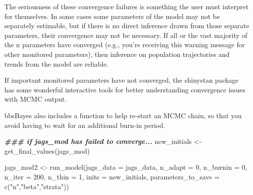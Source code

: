 \documentclass[
]{book}
\newenvironment{Shaded}{\begin{snugshade}}{\end{snugshade}}
\newcommand{\AttributeTok}[1]{\textcolor[rgb]{0.77,0.63,0.00}{#1}}
\newcommand{\CommentTok}[1]{\textcolor[rgb]{0.56,0.35,0.01}{\textit{#1}}}
\newcommand{\DecValTok}[1]{\textcolor[rgb]{0.00,0.00,0.81}{#1}}
\newcommand{\DocumentationTok}[1]{\textcolor[rgb]{0.56,0.35,0.01}{\textbf{\textit{#1}}}}
\newcommand{\FunctionTok}[1]{\textcolor[rgb]{0.00,0.00,0.00}{#1}}
\newcommand{\NormalTok}[1]{#1}
\newcommand{\OtherTok}[1]{\textcolor[rgb]{0.56,0.35,0.01}{#1}}
\newcommand{\SpecialCharTok}[1]{\textcolor[rgb]{0.00,0.00,0.00}{#1}}
\newcommand{\StringTok}[1]{\textcolor[rgb]{0.31,0.60,0.02}{#1}}
\begin{document}
The seriousness of these convergence failures is something the user must interpret for themselves. In some cases some parameters of the model may not be separately estimable, but if there is no direct inference drawn from those separate parameters, their convergence may not be necessary. If all or the vast majority of the n parameters have converged (e.g., you're receiving this warning message for other monitored parameters), then inference on population trajectories and trends from the model are reliable.

If important monitored parameters have not converged, the shinystan package has some wonderful interactive tools for better understanding convergence issues with MCMC output.

\begin{Shaded}
\end{Shaded}

bbsBayes also includes a function to help re-start an MCMC chain, so that you avoid having to wait for an additional burn-in period.

\begin{Shaded}
\begin{Highlighting}[]
\DocumentationTok{\#\#\# if jags\_mod has failed to converge...}
\NormalTok{new\_initials }\OtherTok{\textless{}{-}} \FunctionTok{get\_final\_values}\NormalTok{(jags\_mod)}

\NormalTok{jags\_mod2 }\OtherTok{\textless{}{-}} \FunctionTok{run\_model}\NormalTok{(}\AttributeTok{jags\_data =}\NormalTok{ jags\_data,}
                      \AttributeTok{n\_adapt =} \DecValTok{0}\NormalTok{,}
                      \AttributeTok{n\_burnin =} \DecValTok{0}\NormalTok{,}
                      \AttributeTok{n\_iter =} \DecValTok{200}\NormalTok{,}
                      \AttributeTok{n\_thin =} \DecValTok{1}\NormalTok{,}
                      \AttributeTok{inits =}\NormalTok{ new\_initials,}
                      \AttributeTok{parameters\_to\_save =} \FunctionTok{c}\NormalTok{(}\StringTok{"n"}\NormalTok{,}\StringTok{"beta"}\NormalTok{,}\StringTok{"strata"}\NormalTok{))}
\end{Highlighting}
\end{Shaded}
\end{document}
